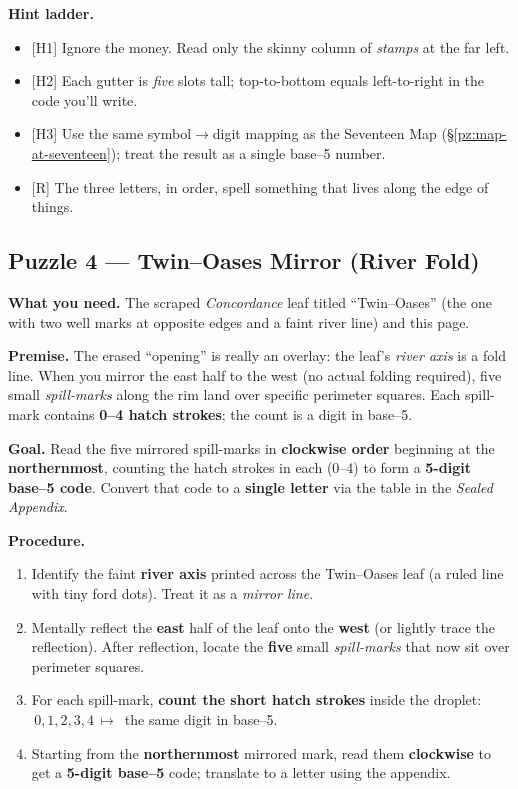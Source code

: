 \documentclass[11pt]{article}
\numberwithin{equation}{section} %
\theoremstyle{plain} %
\theoremstyle{definition} %
\theoremstyle{remark} %
\begin{document}
\medskip
\noindent\textbf{Hint ladder.}
\begin{itemize}\setlength\itemsep{0.25em}
  \item \textsc{[H1]} Ignore the money. Read only the skinny column of \emph{stamps} at the far left.
  \item \textsc{[H2]} Each gutter is \emph{five} slots tall; top-to-bottom equals left-to-right in the code you’ll write.
  \item \textsc{[H3]} Use the same symbol\(\rightarrow\)digit mapping as the Seventeen Map (\S\ref{pz:map-at-seventeen}); treat the result as a single base–5 number.
  \item \textsc{[R]} The three letters, in order, spell something that lives along the edge of things.
\end{itemize}

\subsection{Puzzle 4 — Twin–Oases Mirror (River Fold)}
\label{pz:twin-oases}

\noindent\textbf{What you need.} The scraped \emph{Concordance} leaf titled “Twin–Oases” (the one with two well marks at opposite edges and a faint river line) and this page.

\medskip
\noindent\textbf{Premise.} The erased “opening” is really an overlay: the leaf’s \emph{river axis} is a fold line. When you mirror the east half to the west (no actual folding required), five small \emph{spill-marks} along the rim land over specific perimeter squares. Each spill-mark contains \textbf{0–4 hatch strokes}; the count is a digit in base–5.

\medskip
\noindent\textbf{Goal.} Read the five mirrored spill-marks in \textbf{clockwise order} beginning at the \textbf{northernmost}, counting the hatch strokes in each (0–4) to form a \textbf{5-digit base–5 code}. Convert that code to a \textbf{single letter} via the table in the \emph{Sealed Appendix}.

\medskip
\noindent\textbf{Procedure.}
\begin{enumerate}\setlength\itemsep{0.2em}
  \item Identify the faint \textbf{river axis} printed across the Twin–Oases leaf (a ruled line with tiny ford dots). Treat it as a \emph{mirror line}.
  \item Mentally reflect the \textbf{east} half of the leaf onto the \textbf{west} (or lightly trace the reflection). After reflection, locate the \textbf{five} small \emph{spill-marks} that now sit over perimeter squares.
  \item For each spill-mark, \textbf{count the short hatch strokes} inside the droplet: \(\,0,1,2,3,4\,\mapsto\,\) the same digit in base–5.
  \item Starting from the \textbf{northernmost} mirrored mark, read them \textbf{clockwise} to get a \textbf{5-digit base–5} code; translate to a letter using the appendix.
\end{enumerate}
\end{document}
